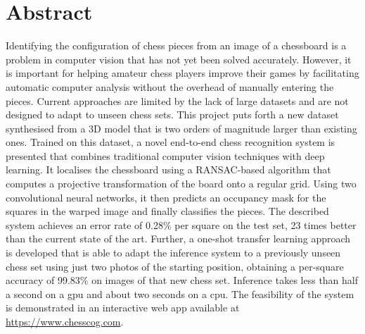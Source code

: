 \documentclass[../report.tex]{subfiles}
\begin{document}
\chapter*{Abstract}

Identifying the configuration of chess pieces from an image of a chessboard is a problem in computer vision that has not yet been solved accurately.
However, it is important for helping amateur chess players improve their games by facilitating automatic computer analysis without the overhead of manually entering the pieces.
Current approaches are limited by the lack of large datasets and are not designed to adapt to unseen chess sets.
This project puts forth a new dataset synthesised from a 3D model that is two orders of magnitude larger than existing ones.
Trained on this dataset, a novel end-to-end chess recognition system is presented that combines traditional computer vision techniques with deep learning.
It localises the chessboard using a RANSAC-based algorithm that computes a projective transformation of the board onto a regular grid.
Using two convolutional neural networks, it then predicts an occupancy mask for the squares in the warped image and finally classifies the pieces.
The described system achieves an error rate of 0.28\% per square on the test set, 23 times better than the current state of the art.
Further, a one-shot transfer learning approach is developed that is able to adapt the inference system to a previously unseen chess set using just two photos of the starting position, obtaining a per-square accuracy of 99.83\% on images of that new chess set.
Inference takes less than half a second on a \acs{gpu} and about two seconds on a \acs{cpu}.
The feasibility of the system is demonstrated in an interactive web app available at \url{https://www.chesscog.com}.
\end{document}
